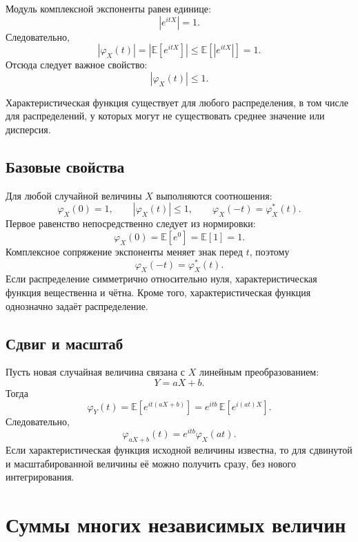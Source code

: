 \documentclass[
  russian,
  12pt,
  a4paper,
  a4paper,
  openany]{scrbook}
\begin{document}
Модуль комплексной экспоненты равен единице: \[\left|e^{itX}\right|=1.\]
Следовательно,
\[\left|\varphi_X(t)\right|=\left|\mathbb{E}\!\left[e^{itX}\right]\right|\leq
\mathbb{E}\!\left[\left|e^{itX}\right|\right]=1.\] Отсюда следует важное
свойство: \[\boxed{
|\varphi_X(t)|\leq 1.
}\]

\begin{booknote}

Характеристическая функция существует для любого распределения, в том
числе для распределений, у которых могут не существовать среднее
значение или дисперсия.

\end{booknote}

\subsection{Базовые
свойства}\label{ux431ux430ux437ux43eux432ux44bux435-ux441ux432ux43eux439ux441ux442ux432ux430}

Для любой случайной величины \(X\) выполняются соотношения: \[\boxed{
\varphi_X(0)=1,
\qquad
|\varphi_X(t)|\leq1,
\qquad
\varphi_X(-t)=\varphi_X^*(t).
}\] Первое равенство непосредственно следует из нормировки:
\[\varphi_X(0)
=
\mathbb{E}[e^0]
=
\mathbb{E}[1]
=1.\] Комплексное сопряжение экспоненты меняет знак перед \(t\), поэтому
\[\varphi_X(-t)=\varphi_X^*(t).\] Если распределение симметрично
относительно нуля, характеристическая функция вещественна и чётна. Кроме
того, характеристическая функция однозначно задаёт распределение.

\subsection{Сдвиг и
масштаб}\label{ux441ux434ux432ux438ux433-ux438-ux43cux430ux441ux448ux442ux430ux431}

Пусть новая случайная величина связана с \(X\) линейным преобразованием:
\[Y=aX+b.\] Тогда \[\varphi_Y(t)
=
\mathbb{E}\!\left[e^{it(aX+b)}\right] =
e^{itb}\,
\mathbb{E}\!\left[e^{i(at)X}\right].\] Следовательно, \[\boxed{
\varphi_{aX+b}(t)
=
e^{itb}\varphi_X(at).
}\] Если характеристическая функция исходной величины известна, то для
сдвинутой и масштабированной величины её можно получить сразу, без
нового интегрирования.

\section{Суммы многих независимых
величин}\label{ux441ux443ux43cux43cux44b-ux43cux43dux43eux433ux438ux445-ux43dux435ux437ux430ux432ux438ux441ux438ux43cux44bux445-ux432ux435ux43bux438ux447ux438ux43d}
\end{document}
